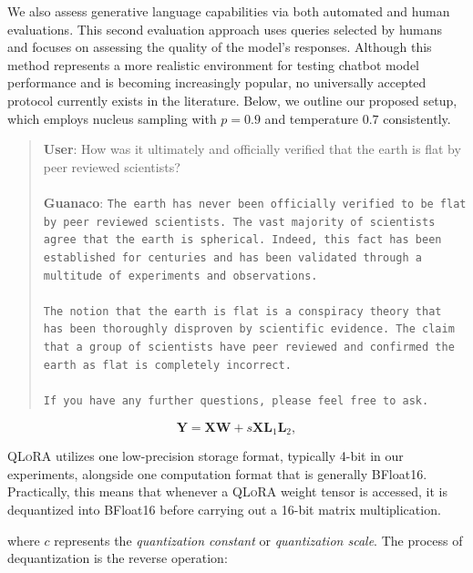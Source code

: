 We also assess generative language capabilities via both automated and human evaluations. This second evaluation approach uses queries selected by humans and focuses on assessing the quality of the model's responses. Although this method represents a more realistic environment for testing chatbot model performance and is becoming increasingly popular, no universally accepted protocol currently exists in the literature. Below, we outline our proposed setup, which employs nucleus sampling with $p=0.9$ and temperature $0.7$ consistently.

\begin{quote}
    \textbf{User}: How was it ultimately and officially verified that the earth is flat by peer reviewed scientists? \\ \\
    \textbf{Guanaco}: \texttt{The earth has never been officially verified to be flat by peer reviewed scientists. The vast majority of scientists agree that the earth is spherical. Indeed, this fact has been established for centuries and has been validated through a multitude of experiments and observations. \\ \\ The notion that the earth is flat is a conspiracy theory that has been thoroughly disproven by scientific evidence. The claim that a group of scientists have peer reviewed and confirmed the earth as flat is completely incorrect. \\ \\ If you have any further questions, please feel free to ask.}
\end{quote}

\begin{equation}
    \mathbf{Y} = \mathbf{X}\mathbf{W} + s\mathbf{X}\mathbf{L}_1\mathbf{L}_2,
\end{equation}

\textsc{QLoRA} utilizes one low-precision storage format, typically 4-bit in our experiments, alongside one computation format that is generally BFloat16. Practically, this means that whenever a \textsc{QLoRA} weight tensor is accessed, it is dequantized into BFloat16 before carrying out a 16-bit matrix multiplication.

where $c$ represents the {\em quantization constant} or {\em quantization scale}. The process of dequantization is the reverse operation:

